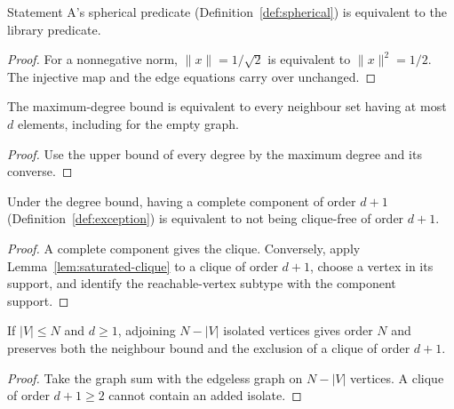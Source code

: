 \begin{lemma}
  \label{lem:bridge-spherical}
  \leanok
  Statement A's spherical predicate
  (Definition~\ref{def:spherical}) is equivalent to the library predicate.
\end{lemma}
\begin{proof}
  For a nonnegative norm, $\|x\| = 1/\sqrt2$ is equivalent to $\|x\|^2 = 1/2$. The
  injective map and the edge equations carry over unchanged.
\end{proof}

\begin{lemma}
  \label{lem:bridge-degree}
  \leanok
  The maximum-degree bound is equivalent to every neighbour set having at most $d$
  elements, including for the empty graph.
\end{lemma}
\begin{proof}
  Use the upper bound of every degree by the maximum degree and its converse.
\end{proof}

\begin{lemma}
  \label{lem:bridge-component}
  \leanok
  Under the degree bound, having a complete component of order $d + 1$
  (Definition~\ref{def:exception}) is equivalent to not being clique-free of order
  $d + 1$.
\end{lemma}
\begin{proof}
  A complete component gives the clique. Conversely, apply
  Lemma~\ref{lem:saturated-clique} to a clique of order $d + 1$, choose a vertex in its
  support, and identify the reachable-vertex subtype with the component support.
\end{proof}

\begin{lemma}
  \label{lem:padding}
  \leanok
  If $|V| \le N$ and $d \ge 1$, adjoining $N - |V|$ isolated vertices gives order $N$ and
  preserves both the neighbour bound and the exclusion of a clique of order $d + 1$.
\end{lemma}
\begin{proof}
  Take the graph sum with the edgeless graph on $N - |V|$ vertices. A clique of order
  $d + 1 \ge 2$ cannot contain an added isolate.
\end{proof}

